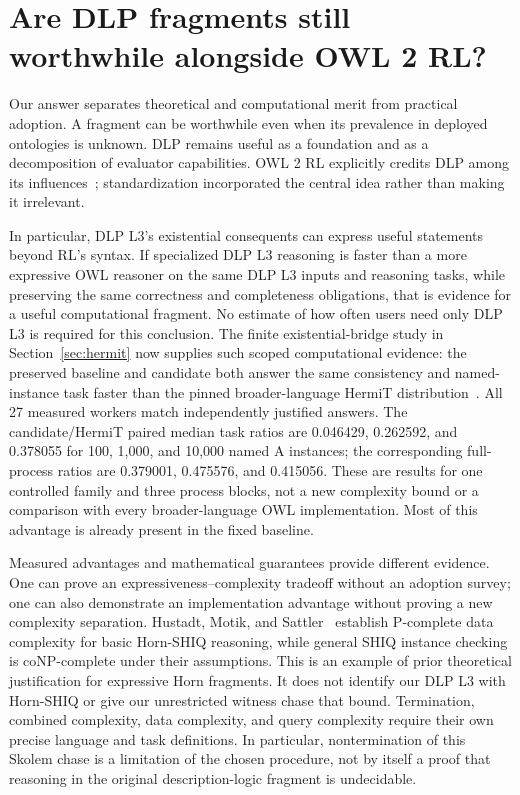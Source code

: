 \section{Are DLP fragments still worthwhile alongside OWL 2 RL?}
\label{sec:profiles}
Our answer separates theoretical and computational merit from practical
adoption. A fragment can be worthwhile even when its prevalence in deployed
ontologies is unknown. DLP remains useful as a foundation and as a decomposition
of evaluator capabilities. OWL 2 RL explicitly credits DLP among its
influences~\cite{owlprofiles2012}; standardization incorporated the central
idea rather than making it irrelevant.

In particular, DLP L3's existential consequents can express useful statements
beyond RL's syntax. If specialized DLP L3 reasoning is faster than a more expressive
OWL reasoner on the same DLP L3 inputs and reasoning tasks, while preserving the
same correctness and completeness obligations, that is evidence for a useful
computational fragment. No estimate of how often users need only DLP L3 is required
for this conclusion. The finite existential-bridge study in
Section~\ref{sec:hermit} now supplies such scoped computational evidence:
the preserved baseline and candidate both answer the same consistency and
named-instance task faster than the pinned broader-language HermiT
distribution~\cite{glimm2014hermit}. All 27 measured workers match independently
justified answers. The candidate/HermiT paired median task ratios are
0.046429, 0.262592, and 0.378055 for 100, 1,000, and 10,000 named A instances;
the corresponding full-process ratios are 0.379001, 0.475576, and 0.415056.
These are results for one controlled family and three process blocks, not a
new complexity bound or a comparison with every broader-language OWL implementation.
Most of this advantage is already present in the fixed baseline.

Measured advantages and mathematical guarantees provide different evidence.
One can prove an expressiveness--complexity tradeoff without an adoption survey;
one can also demonstrate an implementation advantage without proving a new
complexity separation. Hustadt, Motik, and Sattler~\cite{hustadt2005} establish
P-complete data complexity for basic Horn-SHIQ reasoning, while general SHIQ
instance checking is coNP-complete under their assumptions. This is an example
of prior theoretical justification for expressive Horn fragments. It does not
identify our DLP L3 with Horn-SHIQ or give our unrestricted witness chase that bound.
Termination, combined complexity, data complexity, and query complexity require
their own precise language and task definitions.
In particular, nontermination of this Skolem chase is a limitation of the
chosen procedure, not by itself a proof that reasoning in the original
description-logic fragment is undecidable.

